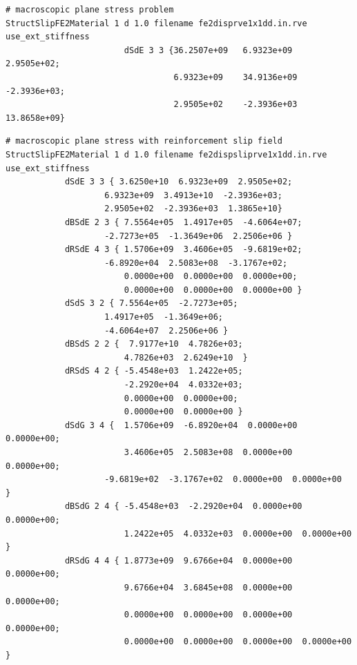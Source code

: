 \documentclass[11pt]{article}
\begin{document}
\begin{lstlisting}[style=oofem,language=oofeminput, caption={Syntax for providing tangent stiffness for macroscopic plane stress problem}, label=lst:tangent_disp]
# macroscopic plane stress problem
StructSlipFE2Material 1 d 1.0 filename fe2disprve1x1dd.in.rve use_ext_stiffness 
                        dSdE 3 3 {36.2507e+09	6.9323e+09	2.9505e+02; 
                                  6.9323e+09	34.9136e+09	-2.3936e+03; 
                                  2.9505e+02	-2.3936e+03	13.8658e+09}
\end{lstlisting}

\begin{minipage}{0.9\textwidth}
\begin{lstlisting}[style=oofem, language=oofeminput, caption={Syntax for providing tangent stiffness for macroscopic plane stress with effective reinforcement slip field}, label=lst:tangent_slip]
# macroscopic plane stress with reinforcement slip field
StructSlipFE2Material 1 d 1.0 filename fe2dispsliprve1x1dd.in.rve use_ext_stiffness 
            dSdE 3 3 { 3.6250e+10  6.9323e+09  2.9505e+02; 
                    6.9323e+09  3.4913e+10  -2.3936e+03; 
                    2.9505e+02  -2.3936e+03  1.3865e+10} 
            dBSdE 2 3 { 7.5564e+05  1.4917e+05  -4.6064e+07; 
                    -2.7273e+05  -1.3649e+06  2.2506e+06 } 
            dRSdE 4 3 { 1.5706e+09  3.4606e+05  -9.6819e+02; 
                    -6.8920e+04  2.5083e+08  -3.1767e+02; 
                        0.0000e+00  0.0000e+00  0.0000e+00; 
                        0.0000e+00  0.0000e+00  0.0000e+00 } 
            dSdS 3 2 { 7.5564e+05  -2.7273e+05; 
                    1.4917e+05  -1.3649e+06; 
                    -4.6064e+07  2.2506e+06 } 
            dBSdS 2 2 {  7.9177e+10  4.7826e+03; 
                        4.7826e+03  2.6249e+10  } 
            dRSdS 4 2 { -5.4548e+03  1.2422e+05; 
                        -2.2920e+04  4.0332e+03; 
                        0.0000e+00  0.0000e+00; 
                        0.0000e+00  0.0000e+00 } 
            dSdG 3 4 {  1.5706e+09  -6.8920e+04  0.0000e+00  0.0000e+00; 
                        3.4606e+05  2.5083e+08  0.0000e+00  0.0000e+00; 
                    -9.6819e+02  -3.1767e+02  0.0000e+00  0.0000e+00  } 
            dBSdG 2 4 { -5.4548e+03  -2.2920e+04  0.0000e+00  0.0000e+00; 
                        1.2422e+05  4.0332e+03  0.0000e+00  0.0000e+00 } 
            dRSdG 4 4 { 1.8773e+09  9.6766e+04  0.0000e+00  0.0000e+00; 
                        9.6766e+04  3.6845e+08  0.0000e+00  0.0000e+00; 
                        0.0000e+00  0.0000e+00  0.0000e+00  0.0000e+00; 
                        0.0000e+00  0.0000e+00  0.0000e+00  0.0000e+00 }
\end{lstlisting}
\end{minipage}
\end{document}
